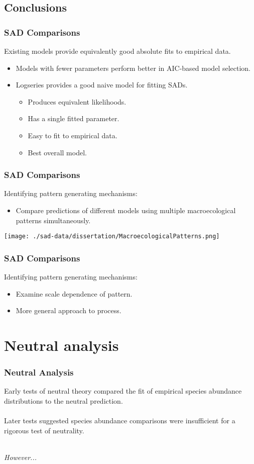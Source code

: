 \documentclass[14pt]{beamer}
\begin{document}
\subsection{Conclusions}
\begin{frame}
\frametitle{SAD Comparisons}
Existing models provide equivalently good absolute fits to empirical data.
\begin{itemize}
\item Models with fewer parameters perform better in AIC-based model selection.\\
\item Logseries provides a good naive model for fitting SADs.\\
\begin{itemize}
\item Produces equivalent likelihoods.
\item Has a single fitted parameter.
\item Easy to fit to empirical data.
\item Best overall model.
\end{itemize}
\end{itemize}
\end{frame}

\begin{frame}[t]
\frametitle{SAD Comparisons}
Identifying pattern generating mechanisms:
\begin{itemize}
\item Compare predictions of different models using multiple macroecological patterns simultaneously.\\
\end{itemize}
\begin{center}  
\texttt{[image: ./sad-data/dissertation/MacroecologicalPatterns.png]}
\end{center}
\end{frame}

\begin{frame}[t]
\frametitle{SAD Comparisons}
Identifying pattern generating mechanisms:
\begin{itemize}
\item Examine scale dependence of pattern.
\item More general approach to process.
\end{itemize}
\end{frame}

\section{Neutral analysis}
\begin{frame}
\frametitle{Neutral Analysis}
Early tests of neutral theory compared the fit of empirical species abundance distributions to the neutral prediction.\\
~\\
Later tests suggested species abundance comparisons were insufficient for a rigorous test of neutrality.\\
~\\
\begin{Large}
\emph{However...}
\end{Large}
\end{frame}
\end{document}
